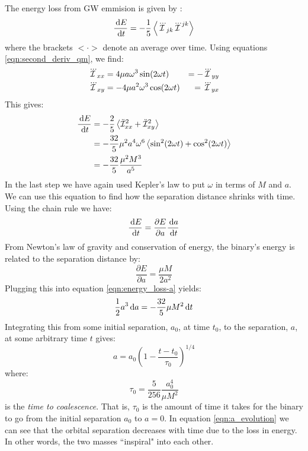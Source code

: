 The energy loss from \ac{GW} emmision is given by \cite{ref:BlanfordThorne}:
\begin{equation}
\label{eqn:energy_loss-t}
\frac{\d E}{\d t} = -\frac{1}{5}\left< \dddot{\qI}_{jk} \dddot{\qI}^{jk} \right>
\end{equation}
where the brackets $<\cdot>$ denote an average over time. Using equations \ref{eqn:second_deriv_qm}, we find:
\begin{align*}
\dddot{\mathcal{I}}_{xx} &= 4 \mu a \omega^3\sin(2\omega t) &= -\dddot{\mathcal{I}}_{yy} \\
\dddot{\mathcal{I}}_{xy} &= -4 \mu a^2 \omega^3\cos(2\omega t) &= \dddot{\mathcal{I}}_{yx}
\end{align*}
This gives:
\begin{align*}
\frac{\,\mathrm{d} E}{\,\mathrm{d} t} &= -\frac{2}{5}\left< \ddot{\mathcal{I}}_{xx}^2 + \ddot{\mathcal{I}}_{xy}^2 \right> \\
    &= -\frac{32}{5} \mu^2 a^4 \omega^6 \left< \sin^2(2\omega t) + \cos^2(2\omega t) \right> \\
    &= -\frac{32}{5} \frac{\mu^2 M^3}{a^5}
\end{align*}
In the last step we have again used Kepler's law to put $\omega$ in terms of $M$ and $a$. We can use this equation to find how the separation distance shrinks with time. Using the chain rule we have:
\begin{equation}
\label{eqn:energy_loss-a}
\frac{\d E}{\d t} = \frac{\partial E}{\partial a}\frac{\d a}{\d t}
\end{equation}
From Newton's law of gravity and conservation of energy, the binary's energy is related to the separation distance by:
\begin{equation*}
\frac{\partial E}{\partial a} = \frac{\mu M}{2a^2}
\end{equation*}
Plugging this into equation \ref{eqn:energy_loss-a} yields:
\begin{equation*}
\frac{1}{2} a^3 \,\mathrm{d} a = -\frac{32}{5} \mu M^2 \,\mathrm{d} t
\end{equation*}
Integrating this from some initial separation, $a_0$, at time $t_0$, to the separation, $a$, at some arbitrary time $t$ gives:
\begin{equation}
\label{eqn:a_evolution}
a = a_0 \left(1 - \frac{t-t_0}{\tau_0} \right)^{1/4}
\end{equation}
where:
\begin{equation}
\label{eqn:tau_0-a}
\tau_0 = \frac{5}{256} \frac{a_0^4}{\mu M^2}
\end{equation}
is the \emph{time to coalescence}. That is, $\tau_0$ is the amount of time it takes for the binary to go from the initial separation $a_0$ to $a=0$. In equation \ref{eqn:a_evolution} we can see that the orbital separation decreases with time due to the loss in energy. In other words, the two masses ``inspiral" into each other.

